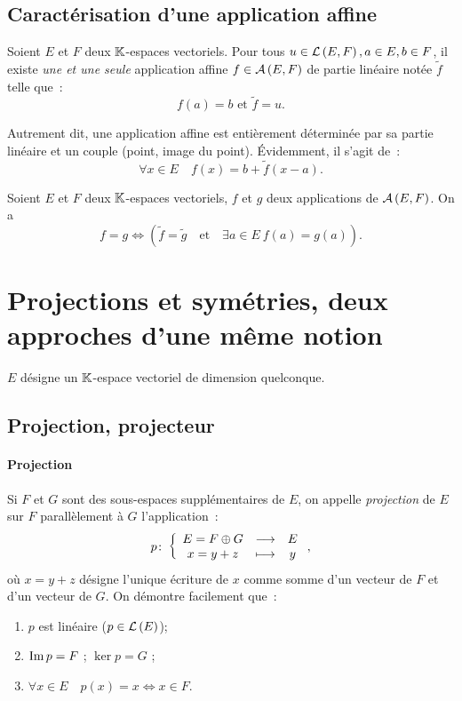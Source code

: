 \subsection{Caractérisation d'une application affine}
\begin{theo}
	Soient $E$ et $F$ deux $\mathbb{K}$-espaces vectoriels. Pour tous $u \in \mathcal{L}\left(E,F\right), a \in E, b \in F$, il existe \emph{une et une seule} application affine $f \in \mathcal{A}\left(E,F\right)$ de partie linéaire notée $\tilde{f}$ telle que~:
	\begin{equation}
		f(a)=b \text{ et } \tilde{f}=u.
	\end{equation}
\end{theo}
Autrement dit, une application affine est entièrement déterminée par sa partie linéaire et un couple (point, image du point). Évidemment, il s'agit de~:
\begin{equation}
	\forall x \in E \quad f(x)=b+\tilde{f}(x-a).
\end{equation}
\begin{corth}
	Soient $E$ et $F$ deux $\mathbb{K}$-espaces vectoriels, $f$ et $g$ deux applications de $\mathcal{A}\left(E,F\right)$. On a 
	\begin{equation}
		f = g \iff (\tilde{f} = \tilde{g} \quad \text{et} \quad \exists a \in E \ f(a)=g(a)).
	\end{equation}
\end{corth}
\section[Projections et symétries]{Projections et symétries, deux approches d'une même notion}

$E$ désigne un $\mathbb{K}$-espace vectoriel de dimension quelconque.
\subsection{Projection, projecteur}

\paragraph{Projection}
Si $F$ et $G$ sont des sous-espaces supplémentaires de $E$, on appelle \emph{projection} de $E$ sur $F$ parallèlement à $G$ l'application~:
\begin{equation}
	p\colon \left\{\begin{array}{ccc} E = F \oplus G & \longrightarrow &E\\ x=y+z & \longmapsto & y \end{array} \right.,
\end{equation}
où $x=y+z$ désigne l'unique écriture de $x$ comme somme d'un vecteur de $F$ et d'un vecteur de $G$. On démontre facilement que~:
\begin{enumerate}
	\item $p$ est linéaire ($p \in \mathcal{L}\left(E\right)$);
	\item $\operatorname{Im}{p} = F$ ; $\ker{p} = G$ ;
	\item $\forall x \in E \quad p(x)=x \iff x \in F$.
\end{enumerate}
